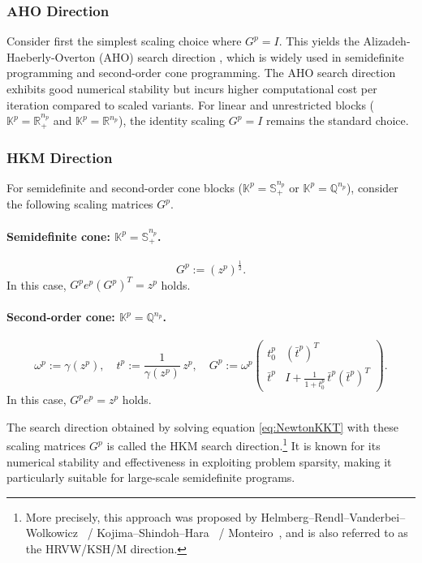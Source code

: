 \subsubsection{AHO Direction}
Consider first the simplest scaling choice where $G^p = I$. 
This yields the Alizadeh-Haeberly-Overton (AHO) search direction \cite{Alizadeh1998}, which is widely used in semidefinite programming and second-order cone programming. 
The AHO search direction exhibits good numerical stability but incurs higher computational cost per iteration compared to scaled variants. 
For linear and unrestricted blocks ($\mathbb{K}^p = \mathbb{R}^{n_p}_+$ and $\mathbb{K}^p = \mathbb{R}^{n_p}$), the identity scaling $G^p = I$ remains the standard choice.


\subsubsection{HKM Direction}
For semidefinite and second-order cone blocks ($\mathbb{K}^p = \mathbb{S}^{n_p}_+$ or $\mathbb{K}^p = \mathbb{Q}^{n_p}$), consider the following scaling matrices $G^p$.

\paragraph{Semidefinite cone: \(\mathbb{K}^p = \mathbb{S}^{n_p}_+\).}
\[
  G^p := (z^p)^{\tfrac12}.
\]
In this case, $G^p e^p (G^p)^T = z^p$ holds.

\paragraph{Second-order cone: \(\mathbb{K}^p = \mathbb{Q}^{n_p}\).}
\[
  \omega^p := \gamma(z^p), 
  \quad
  t^p := \frac{1}{\gamma(z^p)}\, z^p,
  \quad
  G^p :=
  \omega^p
  \begin{pmatrix}
    t^p_0 & (\bar{t}^p)^T \\
    \bar{t}^p & I + \frac{1}{1+t^p_0}\,\bar{t}^p(\bar{t}^p)^T
  \end{pmatrix}.
\]
In this case, $G^p e^p = z^p$ holds.

\medskip 

The search direction obtained by solving equation \eqref{eq:NewtonKKT} with these scaling matrices $G^p$ is called the HKM search direction.\footnote{
More precisely, this approach was proposed by Helmberg--Rendl--Vanderbei--Wolkowicz~\cite{Helmberg1996} / Kojima--Shindoh--Hara~\cite{Kojima1997} / Monteiro~\cite{Monteiro1997}, and is also referred to as the HRVW/KSH/M direction.
} 
It is known for its numerical stability and effectiveness in exploiting problem sparsity, making it particularly suitable for large-scale semidefinite programs.


